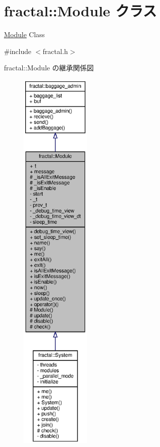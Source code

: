 \section{fractal\+:\+:Module クラス}
\label{classfractal_1_1Module}


\hyperlink{classfractal_1_1Module}{Module} Class  




{\ttfamily \#include $<$fractal.\+h$>$}



fractal\+:\+:Module の継承関係図
\nopagebreak
\begin{figure}[H]
\begin{center}
\leavevmode
\includegraphics[height=550pt]{classfractal_1_1Module__inherit__graph}
\end{center}
\end{figure}


